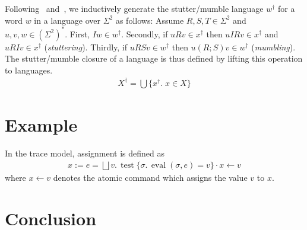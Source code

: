 \documentclass{llncs}
\DeclareMathOperator{\test}{test}
\DeclareMathOperator{\eval}{eval}
\begin{document}
\newpage

Following~\cite{brookes_full_1993} and~\cite{dingel_refinement_2002},
we inductively generate the stutter/mumble language $w^\dagger$ for a
word $w$ in a language over $\Sigma^2$ as follows: Assume $R,S,T \in
\Sigma^2$ and $u,v,w \in (\Sigma^2)^*$. First, $Iw \in
w^\dagger$. Secondly, if $uRv \in x^\dagger$ then $uIRv \in
x^\dagger$ and $uRIv \in x^\dagger$ (\emph{stuttering}). Thirdly, if
$uRSv \in w^\dagger$ then $u(R;S)v \in w^\dagger$
(\emph{mumbling}). The stutter/mumble closure of a language is
thus defined by lifting this operation to languages.
\begin{align*}
X^\dagger = \bigcup\{x^\dagger.\; x \in X\}
\end{align*}

\newpage
\section{Example}

In the trace model, assignment is defined as
\begin{align*}
  x := e = \bigsqcup v.\,\test\{\sigma.\,\eval(\sigma,e) = v\} \cdot x \leftarrow v
\end{align*}
where $x \leftarrow v$ denotes the atomic command which assigns the value $v$ to $x$.

\newpage
\section{Conclusion}

{}

\end{document}
